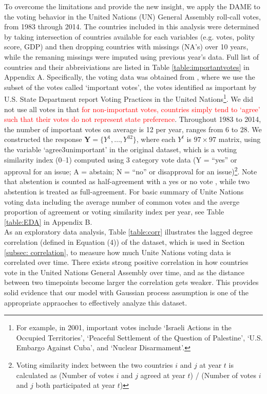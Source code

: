 \documentclass[a4paper]{article}
\begin{document}
To overcome the limitations and provide the new insight, we apply the DAME to the voting behavior in the United Nations (UN) General Assembly roll-call votes, from 1983 through 2014. The countries included in this analysis were determined by taking intersection of countries available for each variables (e.g. votes, polity score, GDP) and then dropping countries with missings (NA's) over 10 years, while the remaning missings were imputed using previous year's data. Full list of countries and their abbreiviations are listed in Table \ref{table:importantvotes} in Appendix A. Specifically, the voting data was obtained from \cite{12379_2016}, where we use the subset of the votes called `important votes', the votes identified as important by U.S. State Department report Voting Practices in the United Nations\footnote{For example, in 2001, important votes include `Israeli Actions in the Occupied Territories', `Peaceful Settlement of the Question of Palestine', `U.S. Embargo Against Cuba', and `Nuclear Disarmament'.}. We did not use all votes in that \textcolor{red}{for non-important votes, countries simply tend to `agree' such that their votes do not represent state preference}. Throughout 1983 to 2014, the number of important votes on average is 12 per year, ranges from 6 to 28. We constructed the response $\mathbf{Y} = \{Y^1,\ldots, Y^{32}\}$, where each $Y^t$ is $97\times 97$ matrix, using the variable `agree3unimportant' in the original dataset, which is a voting similarity index (0--1) computed using 3 category vote data (Y = “yes” or approval for an issue; A = abstain; N = “no” or disapproval for an issue)\footnote{Voting similarity index between the two countries $i$ and $j$ at year $t$ is calculated as (Number of votes $i$ and $j$ agreed at year $t$) / (Number of votes $i$ and $j$ both participated at year $t$)}. Note that abstention is counted as half-agreement with a yes or no vote \citep*{12379_2016}, while two abstention is treated as full-agreement. For basic summary of Unite Nations voting data including the average number of common votes and the averge proportion of agreement or voting similarity index per year, see Table \ref{table:EDA} in Appendix B. \\ \newline
As an exploratory data analysis, Table \ref{table:corr} illustrates the lagged degree correlation (defined in Equation (4)) of the dataset, which is used in Section \ref{subsec: correlation}, to measure how much Unite Nations voting data is correlated over time. There exists strong positive correlation in how countries vote in the United Nations General Assembly over time, and as the distance between two timepoints become larger the correlation gets weaker. This provides solid evidence that our model with Gaussian process assumption is one of the appropriate appraoches to effectively analyze this dataset.
\end{document}
